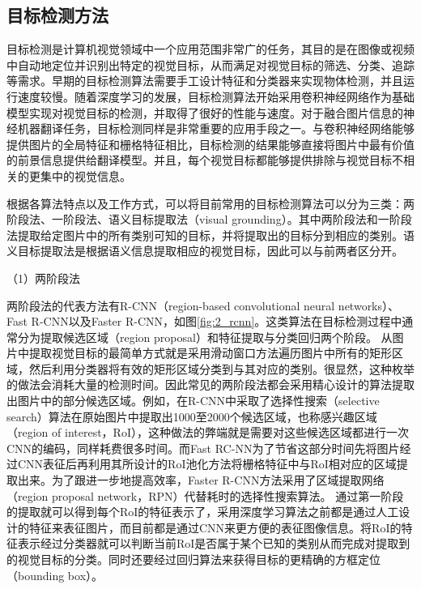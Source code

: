 
\subsection{目标检测方法}
\label{sec:2_object_detection}

目标检测是计算机视觉领域中一个应用范围非常广的任务，其目的是在图像或视频中自动地定位并识别出特定的视觉目标，从而满足对视觉目标的筛选、分类、追踪等需求。早期的目标检测算法需要手工设计特征和分类器来实现物体检测，并且运行速度较慢。随着深度学习的发展，目标检测算法开始采用卷积神经网络作为基础模型实现对视觉目标的检测，并取得了很好的性能与速度。对于融合图片信息的神经机器翻译任务，目标检测同样是非常重要的应用手段之一。与卷积神经网络能够提供图片的全局特征和栅格特征相比，目标检测的结果能够直接将图片中最有价值的前景信息提供给翻译模型。并且，每个视觉目标都能够提供排除与视觉目标不相关的更集中的视觉信息。

根据各算法特点以及工作方式，可以将目前常用的目标检测算法可以分为三类：两阶段法、一阶段法、语义目标提取法（visual grounding）。其中两阶段法和一阶段法提取给定图片中的所有类别可知的目标，并将提取出的目标分到相应的类别。语义目标提取法是根据语义信息提取相应的视觉目标，因此可以与前两者区分开。

{\sffamily （1）两阶段法}

两阶段法的代表方法有R-CNN（region-based convolutional neural networks）、Fast R-CNN以及Faster R-CNN，如图\ref{fig:2_rcnn}。这类算法在目标检测过程中通常分为提取候选区域（region proposal）和特征提取与分类回归两个阶段。
从图片中提取视觉目标的最简单方式就是采用滑动窗口方法遍历图片中所有的矩形区域，然后利用分类器将有效的矩形区域分类到与其对应的类别。很显然，这种枚举的做法会消耗大量的检测时间。因此常见的两阶段法都会采用精心设计的算法提取出图片中的部分候选区域。例如，在R-CNN中采取了选择性搜索（selective search）算法在原始图片中提取出1000至2000个候选区域，也称感兴趣区域（region of interest，RoI），这种做法的弊端就是需要对这些候选区域都进行一次CNN的编码，同样耗费很多时间。而Fast RC-NN为了节省这部分时间先将图片经过CNN表征后再利用其所设计的RoI池化方法将栅格特征中与RoI相对应的区域提取出来。为了跟进一步地提高效率，Faster R-CNN方法采用了区域提取网络（region proposal network，RPN）代替耗时的选择性搜索算法。
通过第一阶段的提取就可以得到每个RoI的特征表示了，采用深度学习算法之前都是通过人工设计的特征来表征图片，而目前都是通过CNN来更方便的表征图像信息。将RoI的特征表示经过分类器就可以判断当前RoI是否属于某个已知的类别从而完成对提取到的视觉目标的分类。同时还要经过回归算法来获得目标的更精确的方框定位（bounding box）。

